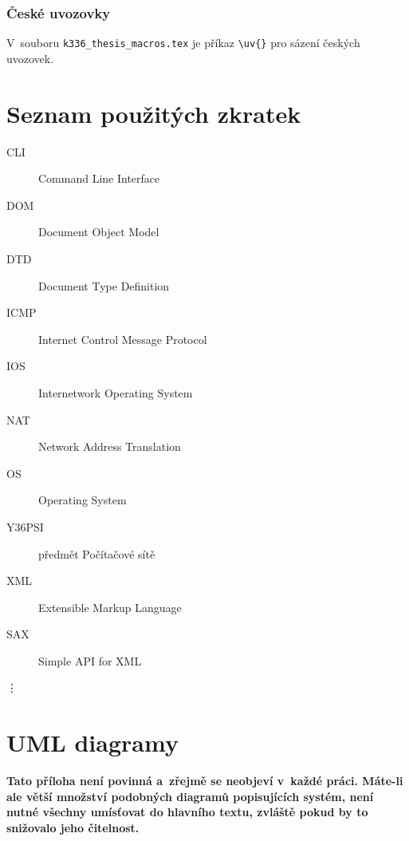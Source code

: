 \documentclass[11pt,twoside,a4paper]{book}
\begin{document}
\subsection{České uvozovky}
V~souboru \verb|k336_thesis_macros.tex| je příkaz \verb|\uv{}| pro sázení českých uvozovek. 


\chapter{Seznam použitých zkratek}

\begin{description}
\item[CLI] Command Line Interface
\item[DOM] Document Object Model
\item[DTD] Document Type Definition
\item[ICMP] Internet Control Message Protocol
\item[IOS] Internetwork Operating System
\item[NAT] Network Address Translation
\item[OS] Operating System
\item[Y36PSI] předmět Počítačové sítě
\item[XML] Extensible Markup Language

\item [SAX] Simple API for XML
\end{description}
\vdots

\chapter{UML diagramy}
\textbf{\large Tato příloha není povinná a~zřejmě se neobjeví v~každé práci. Máte-li ale větší množství podobných
diagramů popisujících systém, není nutné všechny umísťovat do hlavního textu, zvláště pokud by to snižovalo jeho
čitelnost.}
\end{document}
